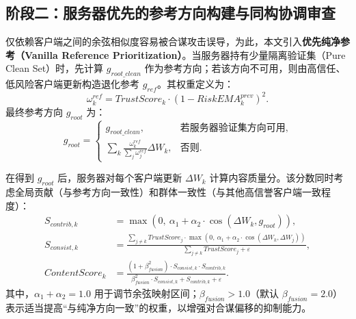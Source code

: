 \documentclass[11pt, a4paper, UTF8, fontset=fandol]{ctexart}
\begin{document}
\subsection{阶段二：服务器优先的参考方向构建与同构协调审查}
仅依赖客户端之间的余弦相似度容易被合谋攻击误导，为此，本文引入\textbf{优先纯净参考（Vanilla Reference Prioritization）}。当服务器持有少量隔离验证集（Pure Clean Set）时，先计算 $g_{root\_clean}$ 作为参考方向；若该方向不可用，则由高信任、低风险客户端更新构造退化参考 $g_{ref}$。其权重定义为：
\begin{equation}
    \omega_{k}^{ref} = TrustScore_{k} \cdot (1 - RiskEMA_{k}^{prev})^{2}.
\end{equation}
最终参考方向 $g_{root}$ 为：
\begin{equation}
    g_{root}=
    \begin{cases}
        g_{root\_clean}, & \text{若服务器验证集方向可用}, \\
        \sum_{k} \frac{\omega_{k}^{ref}}{\sum_j \omega_{j}^{ref}} \Delta W_k, & \text{否则}.
    \end{cases}
\end{equation}

在得到 $g_{root}$ 后，服务器对每个客户端更新 $\Delta W_k$ 计算内容质量分。该分数同时考虑全局贡献（与参考方向一致性）和群体一致性（与其他高信誉客户端一致程度）：
\begin{align}
    S_{contrib,k} &= \max\left(0,\ \alpha_{1} + \alpha_{2} \cdot \cos(\Delta W_{k}, g_{root})\right), \\
    S_{consist,k} &= \frac{\sum_{j\neq k} TrustScore_{j} \cdot \max\left(0,\ \alpha_{1} + \alpha_{2} \cdot \cos(\Delta W_{k}, \Delta W_{j})\right)}{\sum_{j\neq k} TrustScore_{j} + \varepsilon}, \\
    ContentScore_{k} &= \frac{(1 + \beta_{fusion}^{2}) \cdot S_{consist,k} \cdot S_{contrib,k}}{\beta_{fusion}^{2}\cdot S_{consist,k} + S_{contrib,k} + \varepsilon}.
\end{align}
其中，$\alpha_1+\alpha_2=1.0$ 用于调节余弦映射区间；$\beta_{fusion}>1.0$（默认 $\beta_{fusion}=2.0$）表示适当提高“与纯净方向一致”的权重，以增强对合谋偏移的抑制能力。
\end{document}
